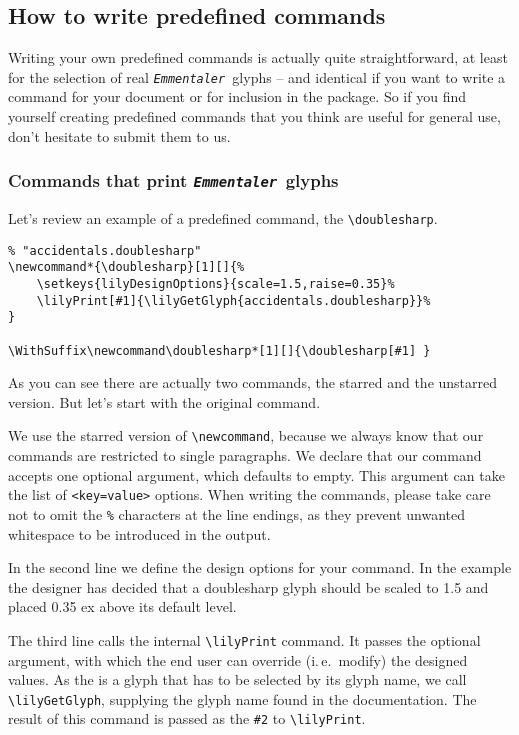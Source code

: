 \documentclass{article}
\newcommand*{\emmentaler}{\texttt{\textit{Emmentaler }}}
\newcommand*{\cmd}[1]{\texttt{\textbackslash #1}}
\begin{document}
\subsection{How to write predefined commands}
Writing your own predefined commands is actually quite straightforward, at least for the selection of real \emmentaler glyphs -- and identical if you want to write a command for your document or for inclusion in the package.
So if you find yourself creating predefined commands that you think are useful for general use, don't hesitate to submit them to us. 

\subsubsection{Commands that print \emmentaler glyphs}
Let's review an example of a predefined command, the \cmd{doublesharp}.

\begin{verbatim}
% "accidentals.doublesharp"
\newcommand*{\doublesharp}[1][]{%
	\setkeys{lilyDesignOptions}{scale=1.5,raise=0.35}%
	\lilyPrint[#1]{\lilyGetGlyph{accidentals.doublesharp}}%
}

\WithSuffix\newcommand\doublesharp*[1][]{\doublesharp[#1] }
\end{verbatim}
As you can see there are actually two commands, the starred and the unstarred version.
But let's start with the original command.

We use the starred version of \cmd{newcommand}, because we always know that our commands are restricted to single paragraphs.
We declare that our command accepts one optional argument, which defaults to empty. 
This argument can take the list of \texttt{<key=value>} options.
When writing the commands, please take care not to omit the \texttt{\%} characters at the line endings, as they prevent unwanted whitespace to be introduced in the output.

In the second line we define the design options for your command.
In the example the designer has decided that a doublesharp glyph should be scaled to 1.5 and placed 0.35 ex above its default level.

The third line calls the internal \cmd{lilyPrint} command. 
It passes the optional argument, with which the end user can override (i.\,e.\ modify) the designed values.
As the \doublesharp* is a glyph that has to be selected by its glyph name, we call \cmd{lilyGetGlyph}, supplying the glyph name found in the documentation.
The result of this command is passed as the \texttt{\#2} to \cmd{lilyPrint}.
\end{document}
